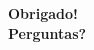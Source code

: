 \documentclass[table, usenames, svgnames, xcolor=dvipsnames]{beamer}
\begin{document}
{%
\begin{frame}[plain]
\begin{center}
{\huge \bf Obrigado! \\
Perguntas?}
\end{center}
	
\end{frame}
}
\end{document}

